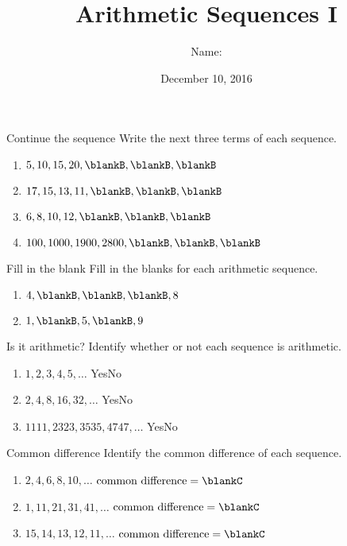 \documentclass[12pt,letterpaper]{article}
\title{Arithmetic Sequences I}
\author{Name: \underline{\hspace{5cm}}}
\date{December 10, 2016}
\begin{document}
\maketitle

\thispagestyle{empty}

\begin{problem}{Continue the sequence}
 Write the next three terms of each sequence.

 \begin{enumerate}[\hspace{.5cm}a.]
  \item $5, 10, 15, 20, \blankB, \blankB, \blankB$
  \item $17, 15, 13, 11, \blankB, \blankB, \blankB$
  \item $6, 8, 10, 12, \blankB, \blankB, \blankB$
  \item $100, 1000, 1900, 2800, \blankB, \blankB, \blankB$
 \end{enumerate}
\end{problem}

\begin{problem}{Fill in the blank}
 Fill in the blanks for each arithmetic sequence.

 \begin{enumerate}[\hspace{.5cm}a.]
  \item $4, \blankB, \blankB, \blankB, 8$
  \item $1, \blankB, 5, \blankB, 9$
 \end{enumerate}
\end{problem}

\begin{problem}{Is it arithmetic?}
 Identify whether or not each sequence is arithmetic.

 \begin{enumerate}[\hspace{.5cm}a.]
  \item $1, 2, 3, 4, 5, \ldots$ \hfill Yes\hspace{3em}No
  \item $2, 4, 8, 16, 32, \ldots$ \hfill Yes\hspace{3em}No
  \item $1111, 2323, 3535, 4747, \ldots$ \hfill Yes\hspace{3em}No
 \end{enumerate}
\end{problem}

\begin{problem}{Common difference}
 Identify the common difference of each sequence.

 \begin{enumerate}[\hspace{.5cm}a.]
  \item $2, 4, 6, 8, 10, \ldots$ \hfill $\text{common difference} = \blankC$
  \item $1, 11, 21, 31, 41, \ldots$ \hfill $\text{common difference} = \blankC$
  \item $15, 14, 13, 12,
  11, \ldots$ \hfill $\text{common difference} = \blankC$
 \end{enumerate}
\end{problem}
\end{document}
